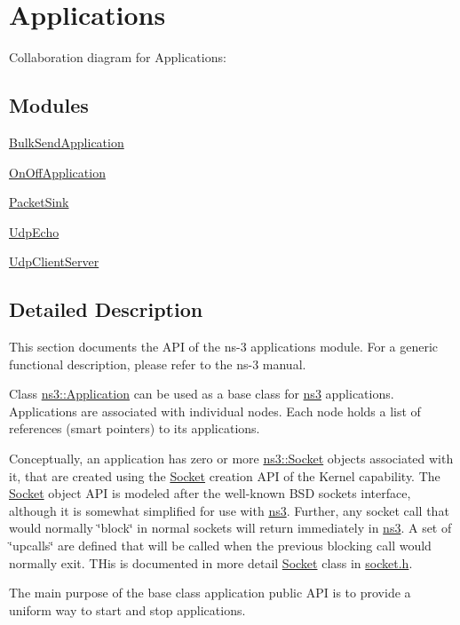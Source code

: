\hypertarget{group__applications}{}\section{Applications}
\label{group__applications}
Collaboration diagram for Applications\+:
\subsection*{Modules}
\begin{DoxyCompactItemize}
\item 
\hyperlink{group__bulksend}{Bulk\+Send\+Application}
\item 
\hyperlink{group__onoff}{On\+Off\+Application}
\item 
\hyperlink{group__packetsink}{Packet\+Sink}
\item 
\hyperlink{group__udpecho}{Udp\+Echo}
\item 
\hyperlink{group__udpclientserver}{Udp\+Client\+Server}
\end{DoxyCompactItemize}


\subsection{Detailed Description}
This section documents the A\+PI of the ns-\/3 applications module. For a generic functional description, please refer to the ns-\/3 manual.

Class \hyperlink{classns3_1_1Application}{ns3\+::\+Application} can be used as a base class for \hyperlink{namespacens3}{ns3} applications. Applications are associated with individual nodes. Each node holds a list of references (smart pointers) to its applications.

Conceptually, an application has zero or more \hyperlink{classns3_1_1Socket}{ns3\+::\+Socket} objects associated with it, that are created using the \hyperlink{classns3_1_1Socket}{Socket} creation A\+PI of the Kernel capability. The \hyperlink{classns3_1_1Socket}{Socket} object A\+PI is modeled after the well-\/known B\+SD sockets interface, although it is somewhat simplified for use with \hyperlink{namespacens3}{ns3}. Further, any socket call that would normally \char`\"{}block\char`\"{} in normal sockets will return immediately in \hyperlink{namespacens3}{ns3}. A set of \char`\"{}upcalls\char`\"{} are defined that will be called when the previous blocking call would normally exit. T\+His is documented in more detail \hyperlink{classns3_1_1Socket}{Socket} class in \hyperlink{socket_8h}{socket.\+h}.

The main purpose of the base class application public A\+PI is to provide a uniform way to start and stop applications. 